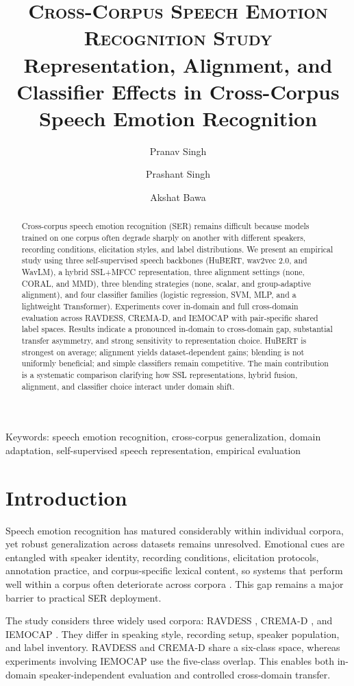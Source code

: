 \documentclass[9pt,twocolumn,letterpaper]{article}
\title{
\usefont{OT1}{bch}{b}{n}
\normalfont \small \textsc{Cross-Corpus Speech Emotion Recognition Study} \\ [4pt]
\huge Representation, Alignment, and Classifier Effects in Cross-Corpus Speech Emotion Recognition \\
}
\author[1]{Pranav Singh}
\author[1]{Prashant Singh}
\author[1]{Akshat Bawa}
\affil[1]{\footnotesize Indian Institute of Technology (IIT), Ropar}
\date{}
\begin{document}
\maketitle

\begin{abstract}
Cross-corpus speech emotion recognition (SER) remains difficult because models trained on one corpus often degrade sharply on another with different speakers, recording conditions, elicitation styles, and label distributions. We present an empirical study using three self-supervised speech backbones (HuBERT, wav2vec 2.0, and WavLM), a hybrid SSL+MFCC representation, three alignment settings (none, CORAL, and MMD), three blending strategies (none, scalar, and group-adaptive alignment), and four classifier families (logistic regression, SVM, MLP, and a lightweight Transformer). Experiments cover in-domain and full cross-domain evaluation across RAVDESS, CREMA-D, and IEMOCAP with pair-specific shared label spaces. Results indicate a pronounced in-domain to cross-domain gap, substantial transfer asymmetry, and strong sensitivity to representation choice. HuBERT is strongest on average; alignment yields dataset-dependent gains; blending is not uniformly beneficial; and simple classifiers remain competitive. The main contribution is a systematic comparison clarifying how SSL representations, hybrid fusion, alignment, and classifier choice interact under domain shift.
\end{abstract}

\noindent
Keywords: speech emotion recognition, cross-corpus generalization, domain adaptation, self-supervised speech representation, empirical evaluation

\section{Introduction}
Speech emotion recognition has matured considerably within individual corpora, yet robust generalization across datasets remains unresolved. Emotional cues are entangled with speaker identity, recording conditions, elicitation protocols, annotation practice, and corpus-specific lexical content, so systems that perform well within a corpus often deteriorate across corpora \cite{schuller2010cross}. This gap remains a major barrier to practical SER deployment.

The study considers three widely used corpora: RAVDESS \cite{livingstone2018ryerson}, CREMA-D \cite{cao2014crema}, and IEMOCAP \cite{busso2008iemocap}. They differ in speaking style, recording setup, speaker population, and label inventory. RAVDESS and CREMA-D share a six-class space, whereas experiments involving IEMOCAP use the five-class overlap. This enables both in-domain speaker-independent evaluation and controlled cross-domain transfer.
\end{document}

